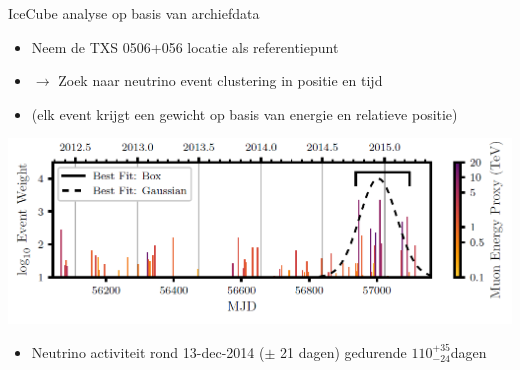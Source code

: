 \Tr
\onecolumn
\begin{center}
{\blue IceCube analyse op basis van archiefdata}
\end{center}
%
\begin{itemize}
\item Neem de TXS 0506+056 locatie als referentiepunt
\item[] $\rightarrow$ Zoek naar neutrino event clustering in positie en tijd
\item[] (elk event krijgt een gewicht op basis van energie en relatieve positie)
\end{itemize}
%
\begin{center}
\includegraphics[keepaspectratio,width=24cm]{txs-time-dependent-IC86b}
\end{center}
%
\begin{itemize}
\item {\blue Neutrino activiteit rond 13-dec-2014 ($\pm$ 21 dagen) gedurende $110^{+35}_{-24}$dagen}
\end{itemize}
